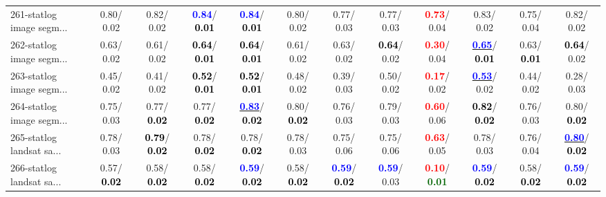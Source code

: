 \begin{table}[h]
\begin{center}
{\begin{tabular}{lc|c|c|c|c|c|c|c|c|c|c}
261-statlog image segm... &   0.80/  0.02 &   0.82/  0.02 & \textcolor{blue}{\textbf{  0.84}}/\textcolor{black}{\textbf{  0.01}} & \textcolor{blue}{\textbf{  0.84}}/\textcolor{black}{\textbf{  0.01}} &   0.80/  0.02 &   0.77/  0.03 &   0.77/  0.03 & \textcolor{red}{\textbf{  0.73}}/  0.04 &   0.83/  0.02 &   0.75/  0.04 &   0.82/  0.02 \\
262-statlog image segm... &   0.63/  0.02 &   0.61/  0.02 & \textcolor{black}{\textbf{  0.64}}/\textcolor{black}{\textbf{  0.01}} & \textcolor{black}{\textbf{  0.64}}/\textcolor{black}{\textbf{  0.01}} &   0.61/  0.02 &   0.63/  0.02 & \textcolor{black}{\textbf{  0.64}}/  0.02 & \textcolor{red}{\textbf{  0.30}}/  0.04 & \underline{\textcolor{blue}{\textbf{  0.65}}}/\textcolor{black}{\textbf{  0.01}} &   0.63/\textcolor{black}{\textbf{  0.01}} & \textcolor{black}{\textbf{  0.64}}/  0.02 \\
263-statlog image segm... &   0.45/  0.02 &   0.41/  0.02 & \textcolor{black}{\textbf{  0.52}}/\textcolor{black}{\textbf{  0.01}} & \textcolor{black}{\textbf{  0.52}}/\textcolor{black}{\textbf{  0.01}} &   0.48/  0.02 &   0.39/  0.03 &   0.50/  0.02 & \textcolor{red}{\textbf{  0.17}}/  0.02 & \underline{\textcolor{blue}{\textbf{  0.53}}}/  0.02 &   0.44/  0.02 &   0.28/  0.03 \\ \hline
264-statlog image segm... &   0.75/  0.03 &   0.77/\textcolor{black}{\textbf{  0.02}} &   0.77/\textcolor{black}{\textbf{  0.02}} & \underline{\textcolor{blue}{\textbf{  0.83}}}/\textcolor{black}{\textbf{  0.02}} &   0.80/\textcolor{black}{\textbf{  0.02}} &   0.76/  0.03 &   0.79/  0.03 & \textcolor{red}{\textbf{  0.60}}/  0.06 & \textcolor{black}{\textbf{  0.82}}/\textcolor{black}{\textbf{  0.02}} &   0.76/  0.03 &   0.80/\textcolor{black}{\textbf{  0.02}} \\
265-statlog landsat sa... &   0.78/  0.03 & \textcolor{black}{\textbf{  0.79}}/\textcolor{black}{\textbf{  0.02}} &   0.78/\textcolor{black}{\textbf{  0.02}} &   0.78/\textcolor{black}{\textbf{  0.02}} &   0.78/  0.03 &   0.75/  0.06 &   0.75/  0.06 & \textcolor{red}{\textbf{  0.63}}/  0.05 &   0.78/  0.03 &   0.76/  0.04 & \underline{\textcolor{blue}{\textbf{  0.80}}}/\textcolor{black}{\textbf{  0.02}} \\
266-statlog landsat sa... &   0.57/\textcolor{black}{\textbf{  0.02}} &   0.58/\textcolor{black}{\textbf{  0.02}} &   0.58/\textcolor{black}{\textbf{  0.02}} & \textcolor{blue}{\textbf{  0.59}}/\textcolor{black}{\textbf{  0.02}} &   0.58/\textcolor{black}{\textbf{  0.02}} & \textcolor{blue}{\textbf{  0.59}}/\textcolor{black}{\textbf{  0.02}} & \textcolor{blue}{\textbf{  0.59}}/  0.03 & \textcolor{red}{\textbf{  0.10}}/\textcolor{darkgreen}{\textbf{  0.01}} & \textcolor{blue}{\textbf{  0.59}}/\textcolor{black}{\textbf{  0.02}} &   0.58/\textcolor{black}{\textbf{  0.02}} & \textcolor{blue}{\textbf{  0.59}}/\textcolor{black}{\textbf{  0.02}} \\

\end{tabular}}
\end{center}
\end{table}
